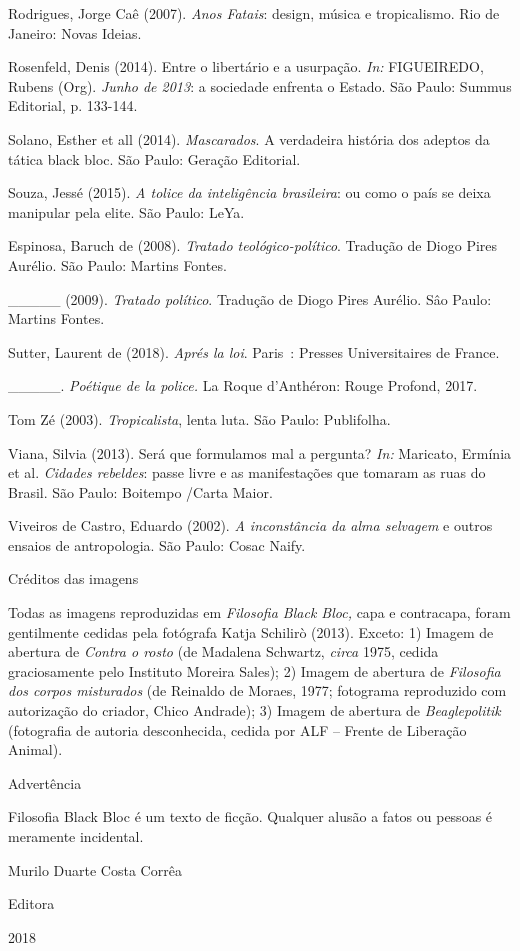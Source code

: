 Rodrigues, Jorge Caê (2007). \emph{Anos Fatais}: design, música e
tropicalismo. Rio de Janeiro: Novas Ideias.

Rosenfeld, Denis (2014). Entre o libertário e a usurpação. \emph{In:
}FIGUEIREDO, Rubens (Org). \emph{Junho de 2013}: a sociedade enfrenta o
Estado. São Paulo: Summus Editorial, p. 133-144.

Solano, Esther et all (2014). \emph{Mascarados}. A verdadeira história
dos adeptos da tática black bloc. São Paulo: Geração Editorial.

Souza, Jessé (2015).\emph{ A tolice da inteligência brasileira}: ou como
o país se deixa manipular pela elite. São Paulo: LeYa.

Espinosa, Baruch de (2008). \emph{Tratado teológico-político}. Tradução
de Diogo Pires Aurélio. São Paulo: Martins Fontes.

\_\_\_\_\_ (2009). \emph{Tratado político}. Tradução de Diogo Pires
Aurélio. Sâo Paulo: Martins Fontes.

Sutter, Laurent de (2018). \emph{Aprés la loi}. Paris~: Presses
Universitaires de France.

\_\_\_\_\_. \emph{Poétique de la police.} La Roque d'Anthéron: Rouge
Profond, 2017.

Tom Zé (2003). \emph{Tropicalista}, lenta luta. São Paulo: Publifolha.

Viana, Silvia (2013). Será que formulamos mal a pergunta? \emph{In:
}Maricato, Ermínia et al. \emph{Cidades rebeldes}: passe livre e as
manifestações que tomaram as ruas do Brasil. São Paulo: Boitempo /Carta
Maior.

Viveiros de Castro, Eduardo (2002). \emph{A inconstância da alma
selvagem }e outros ensaios de antropologia. São Paulo: Cosac Naify.

Créditos das imagens

Todas as imagens reproduzidas em \emph{Filosofia Black Bloc, }capa e
contracapa, foram gentilmente cedidas pela fotógrafa Katja
Schilirò (2013). Exceto: 1) Imagem de abertura de \emph{Contra o rosto}
(de Madalena Schwartz, \emph{circa} 1975, cedida graciosamente pelo
Instituto Moreira Sales); 2) Imagem de abertura de \emph{Filosofia dos
corpos misturados} (de Reinaldo de Moraes, 1977; fotograma reproduzido
com autorização do criador, Chico Andrade); 3) Imagem de abertura de
\emph{Beaglepolitik} (fotografia de autoria desconhecida, cedida por ALF
-- Frente de Liberação Animal).

Advertência

Filosofia Black Bloc é um texto de ficção. Qualquer alusão a fatos ou
pessoas é meramente incidental.

Murilo Duarte Costa Corrêa


Editora

2018
